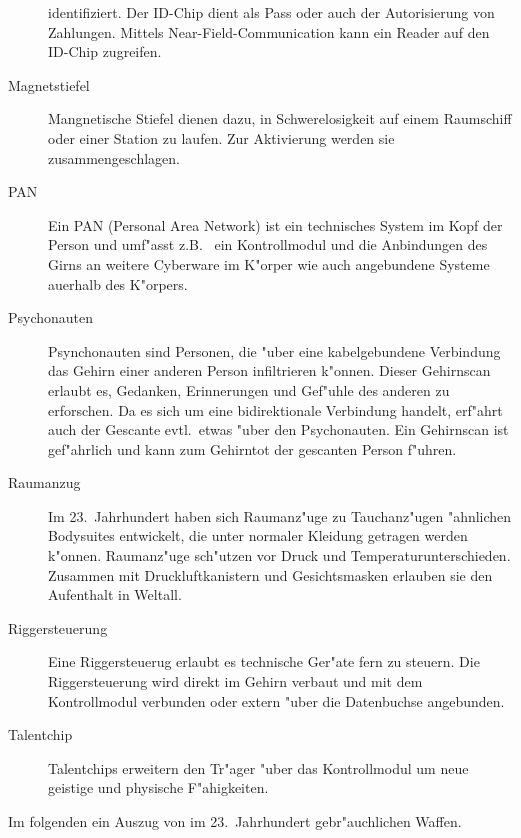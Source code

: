 \begin{description}
      identifiziert. Der ID-Chip dient als Pass oder auch der Autorisierung von Zahlungen. Mittels Near-Field-Communication kann ein Reader auf den ID-Chip zugreifen.
\item [Magnetstiefel] Mangnetische Stiefel dienen dazu, in Schwerelosigkeit auf einem Raumschiff oder einer Station zu
      laufen. Zur Aktivierung werden sie zusammengeschlagen.
\item[PAN] Ein PAN (Personal Area Network) ist ein technisches System im Kopf der Person und umf"asst z.B.~ ein Kontrollmodul und   
      die Anbindungen des Girns an weitere Cyberware im K"orper wie auch angebundene Systeme au\3erhalb des K"orpers.
\item [Psychonauten] Psynchonauten sind Personen, die "uber eine kabelgebundene Verbindung das Gehirn
      einer anderen Person infiltrieren k"onnen. Dieser Gehirnscan erlaubt es, Gedanken, Erinnerungen und Gef"uhle des anderen zu erforschen. Da es sich um eine bidirektionale Verbindung handelt, erf"ahrt auch der Gescante evtl.~etwas "uber den Psychonauten. Ein Gehirnscan ist gef"ahrlich und kann zum Gehirntot der gescanten Person f"uhren.
\item [Raumanzug] Im 23.~Jahrhundert haben sich Raumanz"uge zu Tauchanz"ugen "ahnlichen Bodysuites entwickelt, die unter
      normaler Kleidung getragen werden k"onnen. Raumanz"uge sch"utzen vor Druck und Temperaturunterschieden. Zusammen mit Druckluftkanistern und Gesichtsmasken erlauben sie den Aufenthalt in Weltall.
\item [Riggersteuerung] Eine Riggersteuerug erlaubt es technische Ger"ate fern zu steuern. Die Riggersteuerung wird direkt im 
      Gehirn verbaut und mit dem Kontrollmodul verbunden oder extern "uber die Datenbuchse angebunden.
\item[Talentchip] Talentchips erweitern den Tr"ager "uber das Kontrollmodul um neue geistige und physische F"ahigkeiten. 
\end{description}


Im folgenden ein Auszug von im 23.~Jahrhundert gebr"auchlichen Waffen.

